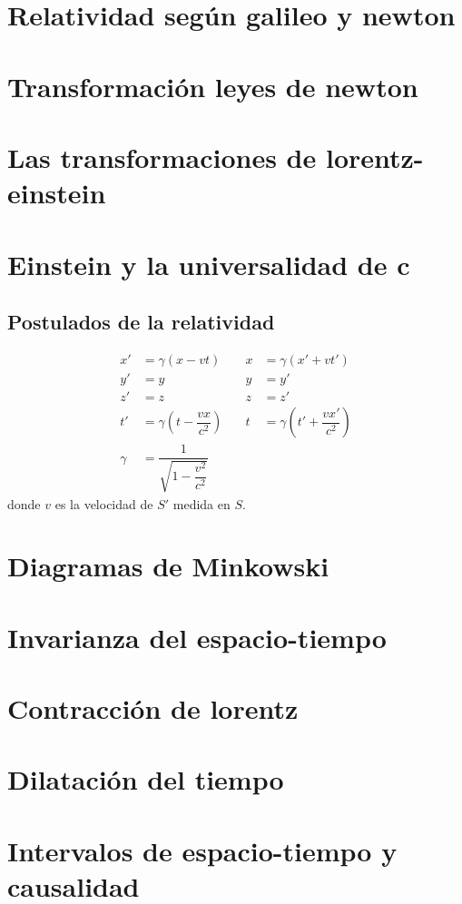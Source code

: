 \documentclass[../main]{subfiles}
\begin{document}
\chapter{Relatividad según galileo y newton}

\chapter{Transformación leyes de newton}

\chapter{Las transformaciones de lorentz-einstein}

\chapter{Einstein y la universalidad de c}

\section{Postulados de la relatividad}


\begin{align}
    x'&=\gamma(x-vt) &\quad x&=\gamma(x'+vt') \\
    y'&=y &\quad y&=y' \\
    z'&=z &\quad z&=z' \\
    t'&=\gamma\left(t-\dfrac{vx}{c^2}\right) &\quad t&=\gamma\left(t'+\dfrac{vx'}{c^2}\right) \\
    \gamma&=\dfrac{1}{\sqrt{1-\dfrac{v^2}{c^2}}}
\end{align}
donde $v$ es la velocidad de $S'$ medida en $S$.

\chapter{Diagramas de Minkowski}

\chapter{Invarianza del espacio-tiempo}

\chapter{Contracción de lorentz}

\chapter{Dilatación del tiempo}

\chapter{Intervalos de espacio-tiempo y causalidad}
\end{document}

